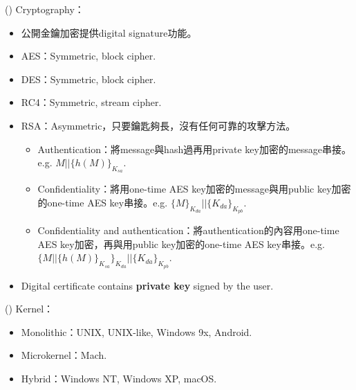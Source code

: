 \begin{theorem}{()} Cryptography： \begin{itemize}
        \item 公開金鑰加密提供digital signature功能。
        \item AES：Symmetric, block cipher.
        \item DES：Symmetric, block cipher.
        \item RC4：Symmetric, stream cipher.
        \item RSA：Asymmetric，只要鑰匙夠長，沒有任何可靠的攻擊方法。\begin{itemize}
            \item Authentication：將message與hash過再用private key加密的message串接。e.g. $M || \{h(M)\}_{K_{sa}}$.
            \item Confidentiality：將用one-time AES key加密的message與用public key加密的one-time AES key串接。e.g. $\{M\}_{K_{da}} || \{K_{da}\}_{K_{pb}}$.
            \item Confidentiality and authentication：將authentication的內容用one-time AES key加密，再與用public key加密的one-time AES key串接。e.g. $\{M || \{h(M)\}_{K_{sa}}\}_{K_{da}} || \{K_{da}\}_{K_{pb}}$.
        \end{itemize}
        \item Digital certificate contains \textbf{private key} signed by the user.
    \end{itemize}
\end{theorem}

\begin{theorem}{()} Kernel：\begin{itemize}
        \item Monolithic：UNIX, UNIX-like, Windows 9x, Android.
        \item Microkernel：Mach.
        \item Hybrid：Windows NT, Windows XP, macOS.
    \end{itemize}
\end{theorem}

